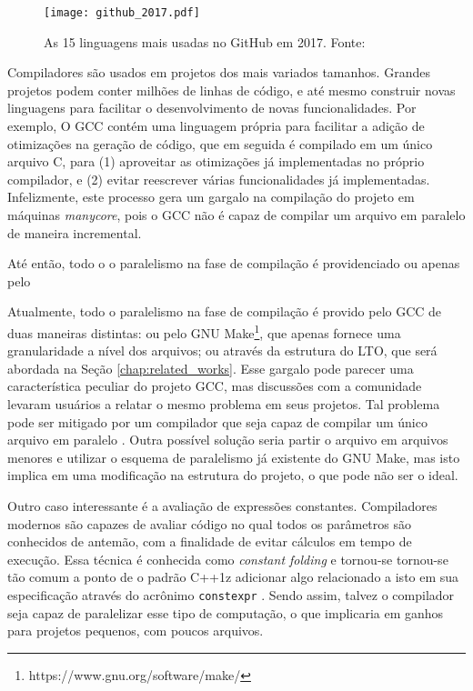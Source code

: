 \begin{figure}[ht]
 \centering
 \texttt{[image: github\_2017.pdf]}
 \caption{As 15 linguagens mais usadas no GitHub em 2017. Fonte: \cite{githuboctoverse}}
 \label{fig:github_2017}
\end{figure}

Compiladores são usados em projetos dos mais variados tamanhos.
Grandes projetos podem conter milhões de linhas de código, e até mesmo
construir novas linguagens para facilitar o desenvolvimento de novas
funcionalidades. Por exemplo, O GCC contém uma linguagem própria para facilitar
a adição de otimizações na geração de código, que em seguida é
compilado em um único arquivo C, para (1) aproveitar as otimizações já
implementadas no próprio compilador, e (2) evitar reescrever várias
funcionalidades já implementadas. Infelizmente, este processo
gera um gargalo na compilação do projeto em máquinas \textit{manycore}, pois o
GCC não é capaz de compilar um arquivo em paralelo de maneira incremental.

Até então, todo o o
paralelismo na fase de compilação é providenciado ou apenas pelo

Atualmente, todo o paralelismo na fase de compilação é provido pelo GCC de
duas maneiras distintas: ou pelo GNU Make\footnote{https://www.gnu.org/software/make/}, 
que apenas fornece uma granularidade a nível dos arquivos; ou através da estrutura do 
LTO, que será abordada na Seção \ref{chap:related_works}. Esse gargalo pode parecer uma
característica peculiar do projeto GCC, mas discussões com a comunidade levaram
usuários a relatar o mesmo problema em seus projetos. Tal problema pode ser
mitigado por um compilador que seja capaz de compilar um único arquivo em paralelo
\citep{mailgcc} \citep{phoronix}.  Outra possível solução seria 
partir o arquivo em arquivos menores e utilizar o esquema de
paralelismo já existente do GNU Make, mas isto implica em uma modificação na
estrutura do projeto, o que pode não ser o ideal.

Outro caso interessante é a avaliação de expressões constantes. Compiladores
modernos são capazes de avaliar código no qual todos os parâmetros são conhecidos
de antemão, com a finalidade de evitar cálculos em tempo de execução. Essa técnica é
conhecida como \textit{constant folding} \citep{dragonbook} e tornou-se tornou-se
tão comum a ponto de o padrão C++1z adicionar algo
relacionado a isto em sua especificação através do acrônimo \texttt{constexpr}
\citep{iso148822017}.
Sendo assim, talvez o compilador seja capaz de paralelizar esse tipo de
computação, o que implicaria em ganhos para projetos pequenos, com poucos
arquivos.

